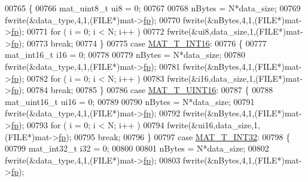 \begin{DoxyCode}
{{{{00765         \{
00766             mat\_uint8\_t ui8 = 0;
00767 
00768             nBytes = N*data\_size;
00769             fwrite(&data\_type,4,1,(FILE*)mat->\hyperlink{struct__mat__t_a85f562e407ca9ad4d2a6e14f839432b7}{fp});
00770             fwrite(&nBytes,4,1,(FILE*)mat->\hyperlink{struct__mat__t_a85f562e407ca9ad4d2a6e14f839432b7}{fp});
00771             \textcolor{keywordflow}{for} ( i = 0; i < N; i++ )
00772                 fwrite(&ui8,data\_size,1,(FILE*)mat->\hyperlink{struct__mat__t_a85f562e407ca9ad4d2a6e14f839432b7}{fp});
00773             \textcolor{keywordflow}{break};
00774         \}
00775         \textcolor{keywordflow}{case} \hyperlink{group___m_a_t_ggacf7b3b879282b7ab3a51190e49bf3453a8c5b2e381946e95ea8d81ac216743302}{MAT\_T\_INT16}:
00776         \{
00777             mat\_int16\_t i16 = 0;
00778 
00779             nBytes = N*data\_size;
00780             fwrite(&data\_type,4,1,(FILE*)mat->\hyperlink{struct__mat__t_a85f562e407ca9ad4d2a6e14f839432b7}{fp});
00781             fwrite(&nBytes,4,1,(FILE*)mat->\hyperlink{struct__mat__t_a85f562e407ca9ad4d2a6e14f839432b7}{fp});
00782             \textcolor{keywordflow}{for} ( i = 0; i < N; i++ )
00783                 fwrite(&i16,data\_size,1,(FILE*)mat->\hyperlink{struct__mat__t_a85f562e407ca9ad4d2a6e14f839432b7}{fp});
00784             \textcolor{keywordflow}{break};
00785         \}
00786         \textcolor{keywordflow}{case} \hyperlink{group___m_a_t_ggacf7b3b879282b7ab3a51190e49bf3453a05bc7af7680aa68be95126ae0a4c2e31}{MAT\_T\_UINT16}:
00787         \{
00788             mat\_uint16\_t ui16 = 0;
00789 
00790             nBytes = N*data\_size;
00791             fwrite(&data\_type,4,1,(FILE*)mat->\hyperlink{struct__mat__t_a85f562e407ca9ad4d2a6e14f839432b7}{fp});
00792             fwrite(&nBytes,4,1,(FILE*)mat->\hyperlink{struct__mat__t_a85f562e407ca9ad4d2a6e14f839432b7}{fp});
00793             \textcolor{keywordflow}{for} ( i = 0; i < N; i++ )
00794                 fwrite(&ui16,data\_size,1,(FILE*)mat->\hyperlink{struct__mat__t_a85f562e407ca9ad4d2a6e14f839432b7}{fp});
00795             \textcolor{keywordflow}{break};
00796         \}
00797         \textcolor{keywordflow}{case} \hyperlink{group___m_a_t_ggacf7b3b879282b7ab3a51190e49bf3453a83e06a68320726c6572bfbb9f3addb1d}{MAT\_T\_INT32}:
00798         \{
00799             mat\_int32\_t i32 = 0;
00800 
00801             nBytes = N*data\_size;
00802             fwrite(&data\_type,4,1,(FILE*)mat->\hyperlink{struct__mat__t_a85f562e407ca9ad4d2a6e14f839432b7}{fp});
00803             fwrite(&nBytes,4,1,(FILE*)mat->\hyperlink{struct__mat__t_a85f562e407ca9ad4d2a6e14f839432b7}{fp});
}}}}
\end{DoxyCode}
